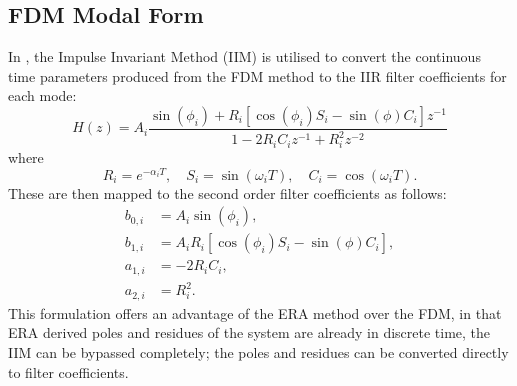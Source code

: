 \subsection{FDM Modal Form}
In \cite{oneill}, the Impulse Invariant Method (IIM) \cite{dsp-book} is utilised to convert the continuous time parameters produced from the FDM method to the IIR filter coefficients for each mode:
\begin{equation}
\label{iim-tf}
H(z) = A_{i} \frac{\sin(\phi_{i}) + R_{i} \left[ \cos(\phi_{i})S_{i} - \sin(\phi)C_{i}\right]z^{-1}}{1 - 2R_{i}C_{i}z^{-1} + R_{i}^{2}z^{-2}}
\end{equation}
where
\begin{equation}
\label{iim-coeff}
R_{i} = e^{-\alpha_{i}T}, \quad S_{i} = \sin(\omega_{i}T), \quad C_{i} = \cos(\omega_{i}T).
\end{equation}
These are then mapped to the second order filter coefficients as follows:
\begin{subequations}
\label{iim-iir-coeffs}
\begin{align}
    b_{0,i} &= A_{i}\sin(\phi_{i}), \\
    b_{1,i} &= A_{i}R_{i} \left[ \cos(\phi_{i})S_{i} - \sin(\phi)C_{i}\right], \\
    a_{1,i} &= -2R_{i}C_{i}, \\
    a_{2,i} &= R_{i}^2.
\end{align}
\end{subequations}
This formulation offers an advantage of the ERA method over the FDM, in that ERA derived poles and residues of the system are already in discrete time, the IIM can be bypassed completely; the poles and residues can be converted directly to filter coefficients.